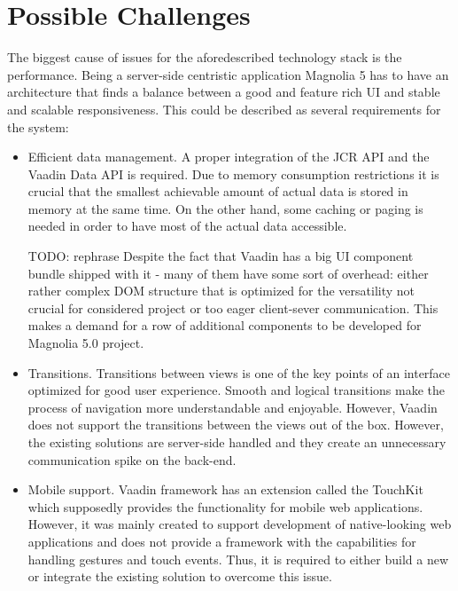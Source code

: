 \section{Possible Challenges}
The biggest cause of issues for the aforedescribed technology stack is the
performance. Being a server-side centristic application Magnolia 5 has to have
an architecture that finds a balance between a good and feature rich UI and
stable and scalable responsiveness. This could be described as several
requirements for the system:

\begin{itemize}
  \item Efficient data management. A proper integration of the JCR API and the
  Vaadin Data API is required. Due to memory consumption restrictions it is
  crucial that the smallest achievable amount of actual data is stored in memory
  at the same time. On the other hand, some caching or paging is needed in order
  to have most of the actual data accessible.
  
  \item [TODO: rephrase] Despite the fact that Vaadin has a big UI component
  bundle shipped with it - many of them have some sort of overhead:
  either rather complex DOM structure that is optimized for the versatility not
  crucial for considered project or too eager client-sever communication. This
  makes a demand for a row of additional components to be developed for Magnolia
  5.0 project.

  \item Transitions. Transitions between views is one of the key points of an
  interface optimized for good user experience. Smooth and logical transitions
  make the process of navigation more understandable and enjoyable. However,
  Vaadin does not support the transitions between the views out of the box.
  However, the existing solutions are server-side handled and they create an
  unnecessary communication spike on the back-end.
  
  \item Mobile support. Vaadin framework has an extension called the TouchKit
  which supposedly provides the functionality for mobile web applications.
  However, it was mainly created to support development of native-looking web
  applications and does not provide a framework with the capabilities for
  handling gestures and touch events. Thus, it is required to either build a new
  or integrate the existing solution to overcome this issue.
\end{itemize} 

\pagebreak
